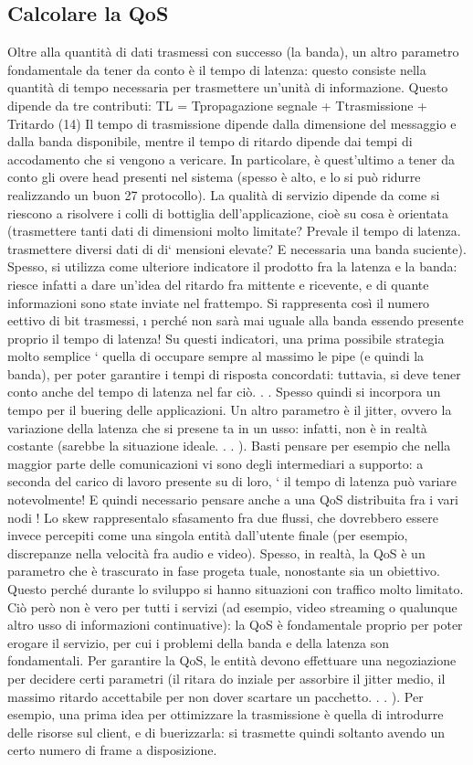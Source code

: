 \subsection{Calcolare la QoS}
Oltre alla quantità di dati trasmessi con successo (la banda), un altro parametro
fondamentale da tener da conto è il tempo di latenza: questo consiste nella
quantità di tempo necessaria per trasmettere un'unità di informazione. Questo
dipende da tre contributi:
TL = Tpropagazione segnale + Ttrasmissione + Tritardo
(14)
Il tempo di trasmissione dipende dalla dimensione del messaggio e dalla banda
disponibile, mentre il tempo di ritardo dipende dai tempi di accodamento che
si vengono a vericare. In particolare, è quest'ultimo a tener da conto gli overe
head presenti nel sistema (spesso è alto, e lo si può ridurre realizzando un buon
27
protocollo).
La qualità di servizio dipende da come si riescono a risolvere i colli di bottiglia
dell'applicazione, cioè su cosa è orientata (trasmettere tanti dati di dimensioni
molto limitate? Prevale il tempo di latenza. trasmettere diversi dati di di`
mensioni elevate? E necessaria una banda suciente). Spesso, si utilizza come
ulteriore indicatore il prodotto fra la latenza e la banda: riesce infatti a dare
un'idea del ritardo fra mittente e ricevente, e di quante informazioni sono state
inviate nel frattempo. Si rappresenta così il numero eettivo di bit trasmessi,
\i{}
perché non sarà mai uguale alla banda essendo presente proprio il tempo di
latenza! Su questi indicatori, una prima possibile strategia molto semplice `
quella di occupare sempre al massimo le pipe (e quindi la banda), per poter
garantire i tempi di risposta concordati: tuttavia, si deve tener conto anche
del tempo di latenza nel far ciò. . . Spesso quindi si incorpora un tempo per il
buering delle applicazioni.
Un altro parametro è il jitter, ovvero la variazione della latenza che si presene
ta in un usso: infatti, non è in realtà costante (sarebbe la situazione ideale. . . ).
Basti pensare per esempio che nella maggior parte delle comunicazioni vi sono
degli intermediari a supporto: a seconda del carico di lavoro presente su di loro,
`
il tempo di latenza può variare notevolmente! E quindi necessario pensare anche
a una QoS distribuita fra i vari nodi !
Lo skew rappresentalo sfasamento fra due flussi, che dovrebbero essere invece
percepiti come una singola entità dall'utente finale (per esempio, discrepanze
nella velocità fra audio e video).
Spesso, in realtà, la QoS è un parametro che è trascurato in fase progeta
tuale, nonostante sia un obiettivo. Questo perché durante lo sviluppo si hanno
situazioni con traffico molto limitato. Ciò però non è vero per tutti i servizi
(ad esempio, video streaming o qualunque altro usso di informazioni continuative): la QoS è fondamentale proprio per
poter erogare il servizio, per cui i
problemi della banda e della latenza son fondamentali. Per garantire la QoS, le
entità devono effettuare una negoziazione per decidere certi parametri (il ritara
do inziale per assorbire il jitter medio, il massimo ritardo accettabile per non
dover scartare un pacchetto. . . ). Per esempio, una prima idea per ottimizzare
la trasmissione è quella di introdurre delle risorse sul client, e di buerizzarla:
si trasmette quindi soltanto avendo un certo numero di frame a disposizione.
